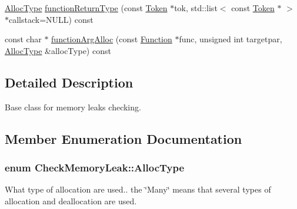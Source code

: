 \begin{DoxyCompactItemize}
\item 
\hyperlink{class_check_memory_leak_ada9e7f7d0af2d8ba771a42d427f51ede}{Alloc\-Type} \hyperlink{class_check_memory_leak_a2cb65cb702db8349ea60a626f6e876a2}{function\-Return\-Type} (const \hyperlink{class_token}{Token} $\ast$tok, std\-::list$<$ const \hyperlink{class_token}{Token} $\ast$ $>$ $\ast$callstack=N\-U\-L\-L) const 
\item 
const char $\ast$ \hyperlink{class_check_memory_leak_a74bcbc735491d28711922c7d822c5b68}{function\-Arg\-Alloc} (const \hyperlink{class_function}{Function} $\ast$func, unsigned int targetpar, \hyperlink{class_check_memory_leak_ada9e7f7d0af2d8ba771a42d427f51ede}{Alloc\-Type} \&alloc\-Type) const 
\end{DoxyCompactItemize}


\subsection{Detailed Description}
Base class for memory leaks checking. 

\subsection{Member Enumeration Documentation}
\hypertarget{class_check_memory_leak_ada9e7f7d0af2d8ba771a42d427f51ede}{
\subsubsection[{Alloc\-Type}]{\setlength{\rightskip}{0pt plus 5cm}enum {\bf Check\-Memory\-Leak\-::\-Alloc\-Type}}}\label{class_check_memory_leak_ada9e7f7d0af2d8ba771a42d427f51ede}


What type of allocation are used.. the \char`\"{}\-Many\char`\"{} means that several types of allocation and deallocation are used. 

